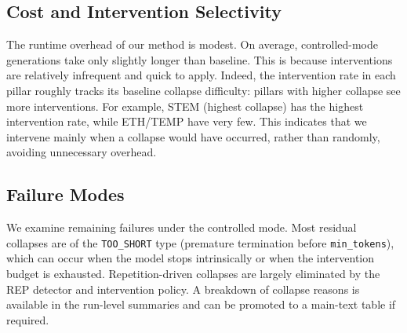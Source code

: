 \documentclass{article}
\begin{document}
\begin{table}[t]
\centering
\scriptsize
\setlength{\tabcolsep}{2.5pt}
\caption{Collapse reduction across five pillars under baseline vs.\ controlled decoding (Gemma~7B, Ollama, 512 tokens fixed).
Rates show Wilson 95\% CIs; $\Delta$/RR/OR use paired bootstrap over seeds (B=20{,}000).}
\label{tab:main}
\end{table}

\subsection{Cost and Intervention Selectivity}
The runtime overhead of our method is modest. On average, controlled-mode generations take only slightly longer than baseline. This is because interventions are relatively infrequent and quick to apply. Indeed, the intervention rate in each pillar roughly tracks its baseline collapse difficulty: pillars with higher collapse see more interventions. For example, STEM (highest collapse) has the highest intervention rate, while ETH/TEMP have very few. This indicates that we intervene mainly when a collapse would have occurred, rather than randomly, avoiding unnecessary overhead.

\subsection{Failure Modes}
We examine remaining failures under the controlled mode. Most residual collapses are of the \texttt{TOO\_SHORT} type (premature termination before \texttt{min\_tokens}), which can occur when the model stops intrinsically or when the intervention budget is exhausted. Repetition-driven collapses are largely eliminated by the REP detector and intervention policy. A breakdown of collapse reasons is available in the run-level summaries and can be promoted to a main-text table if required.
\end{document}
